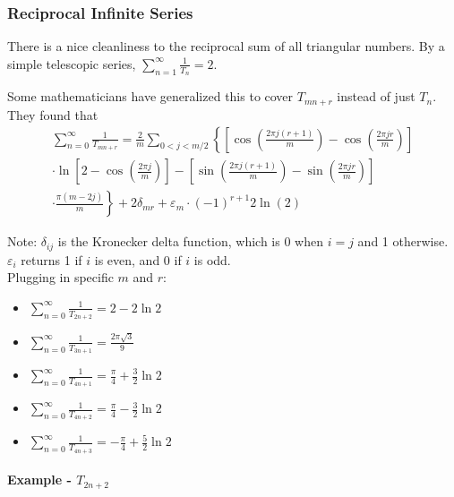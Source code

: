 \documentclass{article}
\begin{document}
\subsubsection{Reciprocal Infinite Series}

There is a nice cleanliness to the reciprocal sum of all triangular numbers. By a simple telescopic series, $\sum_{n=1}^{\infty} \frac{1}{T_n} = 2$.

Some mathematicians have generalized this to cover $T_{mn+r}$ instead of just $T_n$. They found that
\begin{multline*}
		\sum_{n=0}^\infty \frac{1}{T_{mn+r}} = 
		\frac{2}{m} \sum\limits_{0<j<m/2} \left\{ 
		\left[
			\cos \left(\frac{2 \pi j (r+1)}{m} \right) - \cos \left( \frac{2 \pi j r}{m} \right)
		\right] \right. \\
		\left. \cdot \ln \left[ 
		2 - \cos \left( \frac{2 \pi j}{m} \right)
		\right]
		- \left[ \sin \left(\frac{2 \pi j (r+1)}{m} \right) - \sin \left( \frac{2 \pi j r}{m} \right) \right] \right. \\
		\left. \cdot \frac{\pi (m - 2j)}{m}
		\right\} + 2 \delta_{mr} + \varepsilon_m \cdot (-1)^{r+1} 2 \ln(2)
\end{multline*}

Note: $\delta_{ij}$ is the Kronecker delta function, which is 0 when $i=j$ and 1 otherwise. $\varepsilon_i$ returns 1 if $i$ is even, and 0 if $i$ is odd.\\

Plugging in specific $m$ and $r$:

\begin{itemize}
	\item $\sum_{n=0}^\infty \frac{1}{T_{2n+2}} = 2 - 2 \ln 2$
	\item $\sum_{n=0}^\infty \frac{1}{T_{3n+1}} = \frac{2 \pi \sqrt{3}}{9}$
	\item $\sum_{n=0}^\infty \frac{1}{T_{4n+1}} = \frac{\pi}{4} + \frac{3}{2}\ln 2$
	\item $\sum_{n=0}^\infty \frac{1}{T_{4n+2}} = \frac{\pi}{4} - \frac{3}{2}\ln 2$
	\item $\sum_{n=0}^\infty \frac{1}{T_{4n+3}} = - \frac{\pi}{4} + \frac{5}{2}\ln 2$
\end{itemize}

\paragraph{Example  - $T_{2n+2}$}
\end{document}
